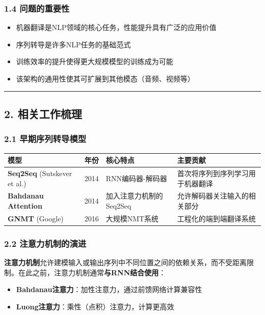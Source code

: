 \documentclass[11pt,a4paper]{article}
\begin{document}
\subsubsection*{1.4 问题的重要性}

\begin{itemize}
  \item 机器翻译是NLP领域的核心任务，性能提升具有广泛的应用价值
  \item 序列转导是许多NLP任务的基础范式
  \item 训练效率的提升使得更大规模模型的训练成为可能
  \item 该架构的通用性使其可扩展到其他模态（音频、视频等）
\end{itemize}

\vspace{0.5em}\noindent\rule{\textwidth}{0.4pt}\vspace{0.5em}

\subsection*{2. 相关工作梳理}

\subsubsection*{2.1 早期序列转导模型}

\begin{center}
\begin{tabular}{|l|l|l|l|}
\hline
模型 & 年份 & 核心特点 & 主要贡献 \\
\hline
\textbf{Seq2Seq} (Sutskever et al.) & 2014 & RNN编码器-解码器 & 首次将序列到序列学习用于机器翻译 \\
\hline
\textbf{Bahdanau Attention} & 2014 & 加入注意力机制的Seq2Seq & 允许解码器关注输入的相关部分 \\
\hline
\textbf{GNMT} (Google) & 2016 & 大规模NMT系统 & 工程化的端到端翻译系统 \\
\hline
\end{tabular}
\end{center}

\subsubsection*{2.2 注意力机制的演进}

\textbf{注意力机制}允许建模输入或输出序列中不同位置之间的依赖关系，而不受距离限制。在此之前，注意力机制通常\textbf{与RNN结合使用}：

\begin{itemize}
  \item \textbf{Bahdanau注意力}：加性注意力，通过前馈网络计算兼容性
  \item \textbf{Luong注意力}：乘性（点积）注意力，计算更高效
\end{itemize}
\end{document}
